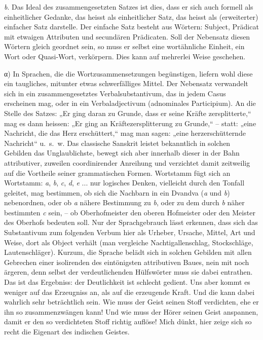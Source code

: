 \textit{b}. Das Ideal des zusammengesetzten Satzes ist dies, dass er sich auch formell als einheitlicher Gedanke, das heisst als einheitlicher Satz, das heisst als (erweiterter) einfacher Satz darstelle. Der einfache Satz besteht aus Wörtern: Subject, Prädicat mit etwaigen Attributen und secundären Prädicaten. Soll der Nebensatz diesen Wörtern gleich geordnet sein, so muss er selbst eine wortähnliche Einheit, ein Wort oder Quasi-Wort, verkörpern. Dies kann auf mehrerlei Weise geschehen.

α) In Sprachen, die die Wortzusammensetzungen begünstigen, liefern wohl diese ein taugliches, mitunter etwas schwerfälliges Mittel. Der Nebensatz verwandelt sich in ein zusammengesetztes Verbalsubstantivum, das in jedem Casus erscheinen mag, oder in ein Verbaladjectivum (adnominales Participium). An die Stelle des Satzes: „Er ging daran zu Grunde, dass er seine Kräfte zersplitterte,“ mag es dann heissen: „Er ging an Kräftezersplitterung zu Grunde,“ – statt: „eine Nachricht, die das Herz erschüttert,“ mag man sagen: „eine herzerschütternde Nachricht“ u.~s.~w. Das classische Sanskrit leistet bekanntlich in solchen Gebilden das Unglaublichste, bewegt sich aber innerhalb dieser in der Bahn attributiver, zuweilen coordinirender Anreihung und verzichtet damit zeitweilig auf die Vortheile seiner grammatischen Formen. Wortstamm fügt sich an Wortstamm: \textit{a}, \textit{b}, \textit{c}, \textit{d}, \textit{e} ... nur logisches Denken, vielleicht durch den Tonfall geleitet, mag bestimmen, ob sich die Nachbarn in ein Dvandva (\textit{a} und \textit{b}) nebenordnen, oder ob \textit{a} nähere Bestimmung zu \textit{b}, oder zu dem durch \textit{b} näher \label{sp.467} bestimmten \textit{c} sein, – ob Oberhofmeister den oberen Hofmeister oder den Meister des Oberhofs bedeuten soll. Nur der Sprachgebrauch lässt erkennen, dass sich das Substantivum zum folgenden Verbum hier als Urheber, Ursache, Mittel, Art und Weise, dort als Object verhält (man vergleiche Nachtigallenschlag, Stockschläge, Lautenschläger). Kurzum, die Sprache belädt sich in solchen Gebilden mit allen Gebrechen einer isolirenden des eintönigsten attributiven Baues, nein mit noch ärgeren, denn selbst der verdeutlichenden Hülfswörter muss sie dabei entrathen. Das ist das Ergebniss: der Deutlichkeit ist schlecht gedient. Uns aber kommt es weniger auf das Erzeugniss an, als auf die erzeugende Kraft. Und die kann dabei wahrlich sehr beträchtlich sein. Wie muss der Geist seinen Stoff verdichten, ehe er ihn so zusammenzwängen kann! Und wie muss der Hörer seinen \label{fp.448} Geist anspannen, damit er den so verdichteten Stoff richtig auflöse! Mich dünkt, hier zeige sich so recht die Eigenart des indischen Geistes.

